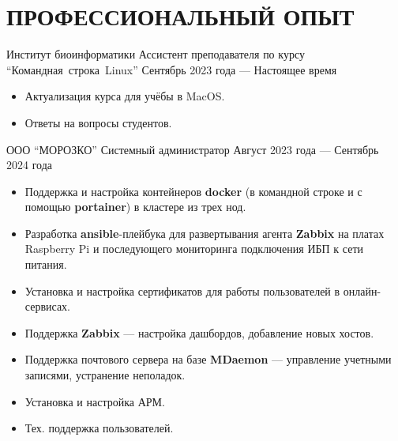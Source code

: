 \section{ПРОФЕССИОНАЛЬНЫЙ ОПЫТ}

\job
    {Институт биоинформатики}
    {Ассистент преподавателя по курсу “\mbox{Командная}~строка~Linux”}
    {Сентябрь 2023 года — Настоящее время}

    \begin{itemize}
      \setlength\itemsep{-.5em}
    \item Актуализация курса для учёбы в MacOS.
    \item Ответы на вопросы студентов.
    \end{itemize}

    \vspace{-0.5em}
    
    \job
        {ООО ``МОРОЗКО''}
        {Системный администратор}
        {Август 2023 года --- Сентябрь 2024 года}

        \begin{itemize}
          \setlength\itemsep{-.5em}
        \item Поддержка и настройка контейнеров \textbf{docker} (в командной строке и с помощью \textbf{portainer}) в кластере из трех нод.
        \item Разработка \textbf{ansible}-плейбука для развертывания агента \textbf{Zabbix} на платах Raspberry Pi и последующего мониторинга подключения ИБП к сети питания.
        \item Установка и настройка сертификатов для работы пользователей в онлайн-сервисах.
        \item Поддержка \textbf{Zabbix} — настройка дашбордов, добавление новых хостов.
        \item Поддержка почтового сервера на базе \textbf{MDaemon} — управление учетными записями, устранение неполадок.
        \item Установка и настройка АРМ.
        \item Тех. поддержка пользователей.
        \end{itemize}
